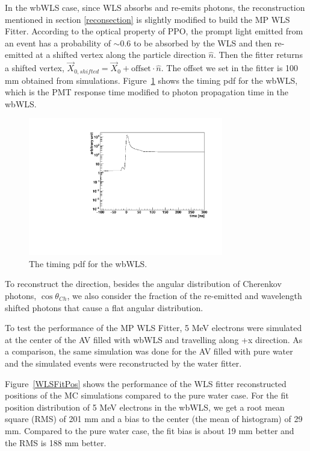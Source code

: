 \documentclass[preprint,12pt]{elsarticle}
\numberwithin{equation}{section}
\begin{document}
In the wbWLS case, since WLS absorbs and re-emits photons, the reconstruction mentioned in section  \ref{reconsection} is slightly modified to build the MP WLS Fitter. According to the optical property of PPO, the prompt light emitted from an event has a probability of $\sim$0.6 to be absorbed by the WLS and then re-emitted at a shifted vertex along the particle direction $\hat{n}$. Then the fitter returns a shifted vertex, $\vec{X}_{0,shifted}=\vec{X}_0+\mathrm{offset}\cdot\hat{n}$. The offset we set in the fitter is 100 mm obtained from simulations. Figure~\ref{WLS_pdf} shows the timing pdf for the wbWLS, which is the PMT response time modified to photon propagation time in the wbWLS.
\begin{figure}[htbp]	
	\centering		
	\begin{minipage}[b]{0.5\textwidth}			
		\includegraphics[height=6cm]{WLSTime_pdf.pdf}			
	\end{minipage}%
	\caption{\label{WLS_pdf} The timing pdf for the wbWLS.}	
\end{figure}

To reconstruct the direction, besides the angular distribution of Cherenkov photons, $\cos\theta_{Ch}$, we also consider the fraction of the re-emitted and wavelength shifted photons that cause a flat angular distribution.

To test the performance of the MP WLS Fitter, 5 MeV electrons were simulated at the center of the AV filled with wbWLS and travelling along +x direction. As a comparison, the same simulation was done for the AV filled with pure water and the simulated events were reconstructed by the water fitter.

Figure~\ref{WLSFitPos} shows the performance of the WLS fitter reconstructed positions of the MC simulations compared to the pure water case. For the fit position distribution of 5 MeV electrons in the wbWLS, we get a root mean square (RMS) of 201 mm and a bias to the center (the mean of histogram) of 29 mm. Compared to the pure water case, the fit bias is about 19 mm better and the RMS is 188 mm better.
\end{document}
